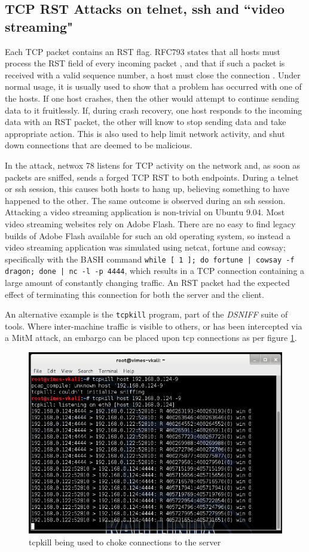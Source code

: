 \subsection{TCP RST Attacks on telnet, ssh and ``video streaming"}

Each TCP packet contains an RST flag. RFC793 states that all hosts must process the RST field of every incoming packet
\cite[p. 26]{rfc793}, and that if such a packet is received with a valid sequence number, a host must close the
connection \cite[p. 37]{rfc793}. Under normal usage, it is usually used to show that a problem has occurred with one of
the hosts. If one host crashes, then the other would attempt to continue sending data to it fruitlessly. If, during
crash recovery, one host responds to the incoming data with an RST packet, the other will know to stop sending data and
take appropriate action. This is also used to help limit network activity, and shut down connections that are deemed to
be malicious.

In the attack, netwox 78 listens for TCP activity on the network and, as soon as packets are sniffed, sends a forged TCP
RST to both endpoints. During a telnet or ssh session, this causes both hosts to hang up, believing something to have
happened to the other. The same outcome is observed during an ssh session. Attacking a video streaming application is
non-trivial on Ubuntu 9.04. Most video streaming websites rely on Adobe Flash. There are no easy to find legacy builds
of Adobe Flash available for such an old operating system, so instead a video streaming application was simulated using
netcat, fortune and cowsay; specifically with the BASH command {\tt while [ 1 ]; do fortune | cowsay -f dragon; done |
nc -l -p 4444}, which results in a TCP connection containing a large amount of constantly changing traffic. An RST
packet had the expected effect of terminating this connection for both the server and the client.

An alternative example is the {\tt tcpkill} program, part of the \emph{DSNIFF} suite of tools. Where inter-machine
traffic is visible to others, or has been intercepted via a MitM attack, an embargo can be placed upon tcp connections as
per figure \ref{fig:tcpkill}.

\begin{figure}[h]
    \centering
    \includegraphics[width=.5\linewidth]{images/tcpkill.png}
    \caption{tcpkill being used to choke connections to the server}
    \label{fig:tcpkill}
\end{figure}

